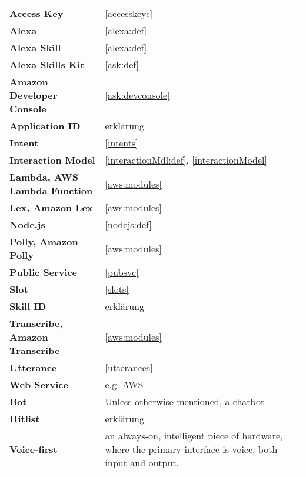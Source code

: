 \begin{flushleft}
\begin{tabular}{ll}

\textbf{Access Key}			&	 	\ref{accesskeys}\\


\textbf{Alexa}				&		\ref{alexa:def}\\
\textbf{Alexa Skill}		&		\ref{alexa:def}\\
\textbf{Alexa Skills Kit}	&		\ref{ask:def}\\
\textbf{Amazon Developer Console}&	\ref{ask:devconsole}\\

\textbf{Application ID}		&	erklärung\\

\textbf{Intent}				&		\ref{intents}\\
\textbf{Interaction Model}	&		\ref{interactionMdl:def}, \ref{interactionModel}\\



\textbf{Lambda, AWS Lambda Function}	&		\ref{aws:modules}\\
\textbf{Lex, Amazon Lex}	&		\ref{aws:modules}\\

\textbf{Node.js}			&		\ref{nodejs:def}\\

\textbf{Polly, Amazon Polly}&		\ref{aws:modules}\\
\textbf{Public Service}			&	\ref{pubsvc}\\
\textbf{Slot}				&		\ref{slots}\\
\textbf{Skill ID}			&	erklärung\\
\textbf{Transcribe, Amazon Transcribe}	&		\ref{aws:modules}\\

\textbf{Utterance}			&		\ref{utterances}\\



\textbf{Web Service}			&		e.g. AWS\\




\textbf{Bot}				&	Unless otherwise mentioned, a chatbot\\
\textbf{Hitlist}			&	erklärung\\
\textbf{Voice-first}		& an always-on, intelligent piece of hardware, where the primary interface is voice, both input and output.\\



\end{tabular}
\end{flushleft}
